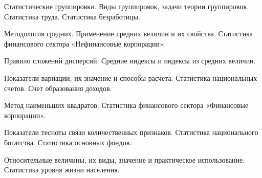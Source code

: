 \newpage


\shapkFull
\setcounter{zad}{0}

\z Статистические группировки. Виды группировок, задачи теории группировок.
 \medskip
\z Статистика труда. Статистика безработицы.
 \medskip

\newpage


\shapkFull
\setcounter{zad}{0}

\z Методология средних. Применение средних величин и их свойства.
 \medskip
\z Статистика финансового сектора «Нефинансовые корпорации».
 \medskip

\newpage


\shapkFull
\setcounter{zad}{0}

\z Правило сложений дисперсий.
 \medskip
\z Средние индексы и индексы из средних величин.
 \medskip

\newpage


\shapkFull
\setcounter{zad}{0}

\z Показатели вариации, их значение и способы расчета.
 \medskip
\z Статистика национальных счетов. Счет образования доходов.
 \medskip

\newpage


\shapkFull
\setcounter{zad}{0}

\z Метод наименьших квадратов.
 \medskip
\z Статистика финансового сектора «Финансовые корпорации».
 \medskip

\newpage


\shapkFull
\setcounter{zad}{0}

\z Показатели тесноты связи количественных признаков.
 \medskip
\z Статистика национального богатства. Статистика основных фондов.
 \medskip

\newpage


\shapkFull
\setcounter{zad}{0}

\z Относительные величины, их виды, значение и практическое использование.
 \medskip
\z Статистика уровня жизни населения. \medskip

\newpage


\shapkFull
\setcounter{zad}{0}


